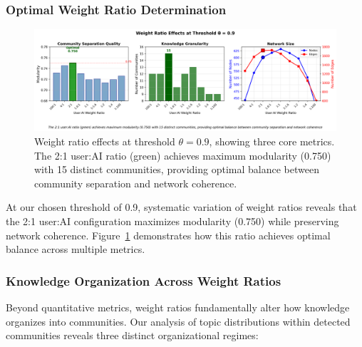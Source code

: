 \subsubsection{Optimal Weight Ratio Determination}

\begin{figure}[h]
\centering
\includegraphics[width=\textwidth]{./images/weight_ratio_analysis_clean.png}
\caption{Weight ratio effects at threshold $\theta = 0.9$, showing three core metrics. The 2:1 user:AI ratio (green) achieves maximum modularity (0.750) with 15 distinct communities, providing optimal balance between community separation and network coherence.}
\label{fig:weight_ratio_analysis}
\end{figure}

At our chosen threshold of 0.9, systematic variation of weight ratios reveals that the 2:1 user:AI configuration maximizes modularity (0.750) while preserving network coherence. Figure~\ref{fig:weight_ratio_analysis} demonstrates how this ratio achieves optimal balance across multiple metrics.

\subsubsection{Knowledge Organization Across Weight Ratios}

Beyond quantitative metrics, weight ratios fundamentally alter how knowledge organizes into communities. Our analysis of topic distributions within detected communities reveals three distinct organizational regimes:

